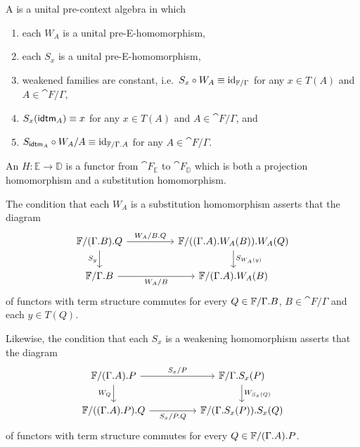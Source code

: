\begin{defn}
\label{defn:esystems}
A  is a unital pre-context algebra in which 
\begin{enumerate}
\item each $W_A$ is a unital pre-E-homomorphism,
\item each $S_x$ is a unital pre-E-homomorphism,
\item \label{tTf:StWf_id} weakened families are constant, i.e.~$S_x\circ W_A\equiv {\mathrm{id}_{\mathbb{F}/\Gamma}}$ for any $x\in T(A)$ and $A\in\cat{F}/\Gamma$,
\item $S_x(\tfid{A})\jdeq x$ for any $x\in T(A)$ and $A\in\cat{F}/\Gamma$, and
\item \label{f:SidfWff_id} $S_{\tfid{A}}\circ W_A/A\jdeq \catid{\cat{F}/\ctxext{\Gamma}{A}}$ for any $A\in\cat{F}/\Gamma$.
\end{enumerate}
An  $H:\mathbb{E}\to\mathbb{D}$ is a functor from
$\cat{F}_{\mathbb{E}}$ to $\cat{F}_{\mathbb{D}}$ which is both a projection
homomorphism and a substitution homomorphism.
\end{defn}

\begin{rmk}
The condition that each $W_A$ is a substitution homomorphism asserts that
the diagram
\begin{equation*}
\begin{tikzcd}[column sep=huge]
\cat{F}/\ctxext{{\Gamma}{B}}{Q}
  \arrow[r,"W_A/\ctxext{B}{Q}"]
  \arrow[d,swap,"S_y"]
  &
\cat{F}/\ctxext{{{\Gamma}{A}}{W_A(B)}}{W_A(Q)}
  \arrow[d,"S_{W_A(y)}"]
  \\
\cat{F}/\ctxext{\Gamma}{B}
  \arrow[r,swap,"W_A/B"]
  &
\cat{F}/\ctxext{{\Gamma}{A}}{W_A(B)}
\end{tikzcd}
\end{equation*}
of functors with term structure commutes for every 
$Q\in\cat{F}/\ctxext{\Gamma}{B}$, $B\in\cat{F}/\Gamma$ and each $y\in T(Q)$.

Likewise, the condition that each $S_x$ is a weakening homomorphism
asserts that the diagram
\begin{equation*}
\begin{tikzcd}[column sep=huge]
\cat{F}/\ctxext{{\Gamma}{A}}{P}
  \arrow[r,"S_x/P"]
  \arrow[d,swap,"W_Q"]
  &
\cat{F}/\ctxext{\Gamma}{S_x(P)}
  \arrow[d,"W_{S_x(Q)}"]
  \\
\cat{F}/\ctxext{{{\Gamma}{A}}{P}}{Q}
  \arrow[r,swap,"S_x/\ctxext{P}{Q}"]
  &
\cat{F}/\ctxext{{\Gamma}{S_x(P)}}{S_x(Q)}
\end{tikzcd}
\end{equation*}
of functors with term structure commutes for every 
$Q\in\cat{F}/\ctxext{{\Gamma}{A}}{P}$.
\end{rmk}

